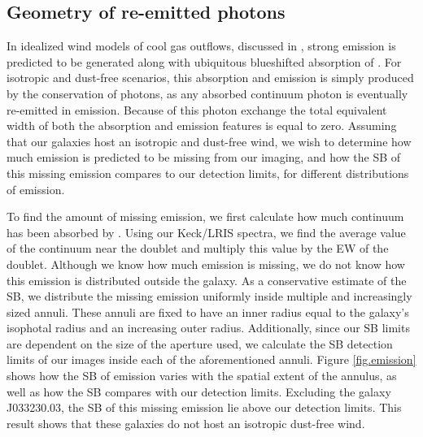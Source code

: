 \documentclass[twocolumn]{aastex61}
\begin{document}
\subsection{Geometry of re-emitted photons}
In idealized wind models of cool gas outflows, discussed in \cite{Prochaska_2011}, strong  emission is predicted to be generated along with ubiquitous blueshifted absorption of . For isotropic and dust-free scenarios, this absorption and emission is simply produced by the conservation of photons, as any absorbed continuum photon is eventually re-emitted in emission. Because of this photon exchange the total equivalent width of both the absorption and emission features is equal to zero.
Assuming that our galaxies host an isotropic and dust-free wind, we wish to determine how much emission is predicted to be missing from our imaging, and how the SB of this missing emission compares to our detection limits, for different distributions of emission. 

To find the amount of missing emission, we first calculate how much continuum has been absorbed by . Using our Keck/LRIS spectra, we find the average value of the continuum near the  doublet and multiply this value by the EW of the doublet. Although we know how much emission is missing, we do not know how this emission is distributed outside the galaxy. As a conservative estimate of the SB, we distribute the missing emission uniformly inside multiple and increasingly sized annuli. These annuli are fixed to have an inner radius equal to the galaxy's isophotal radius and an increasing outer radius.  Additionally, since our SB limits are dependent on the size of the aperture used, we calculate the SB detection limits of our images inside each of the aforementioned annuli. Figure \ref{fig.emission} shows how the SB of emission varies with the spatial extent of the annulus, as well as how the SB compares with our detection limits. Excluding the galaxy J033230.03, the SB of this missing emission lie above our detection limits. This result shows that these galaxies do not host an isotropic dust-free wind.
\end{document}

